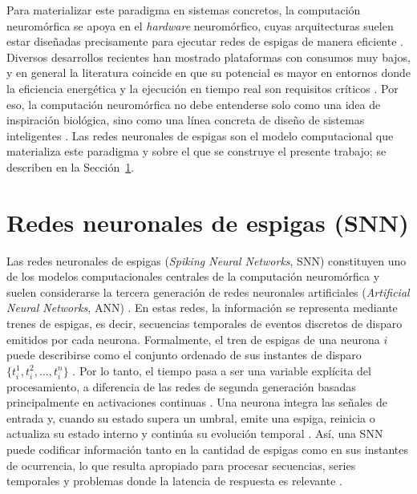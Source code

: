 Para materializar este paradigma en sistemas concretos, la computación neuromórfica se apoya en el \textit{hardware} neuromórfico, cuyas arquitecturas suelen estar diseñadas precisamente para ejecutar redes de espigas de manera eficiente \cite{Schuman2022Opportunities, Muir2025commercialsuccessforneuromorphictechnologies, Yao2024neuromorphicchip}. Diversos desarrollos recientes han mostrado plataformas con consumos muy bajos, y en general la literatura coincide en que su potencial es mayor en entornos donde la eficiencia energética y la ejecución en tiempo real son requisitos críticos \cite{yan2026reconsideringenergyefficiencyspiking}. Por eso, la computación neuromórfica no debe entenderse solo como una idea de inspiración biológica, sino como una línea concreta de diseño de sistemas inteligentes \cite{Kudithipudi2025Neuromorphiccomputingatscale}. Las redes neuronales de espigas son el modelo computacional que materializa este paradigma y sobre el que se construye el presente trabajo; se describen en la Sección~\ref{sec:snn}.


\section{Redes neuronales de espigas (SNN)}\label{sec:snn}

Las redes neuronales de espigas (\textit{Spiking Neural Networks}, SNN) constituyen uno de los modelos computacionales centrales de la computación neuromórfica y suelen considerarse la tercera generación de redes neuronales artificiales (\textit{Artificial Neural Networks}, ANN) \cite{MAASS19971659ssnthirdgeneration}. En estas redes, la información se representa mediante trenes de espigas, es decir, secuencias temporales de eventos discretos de disparo emitidos por cada neurona. Formalmente, el tren de espigas de una neurona $i$ puede describirse como el conjunto ordenado de sus instantes de disparo $\{t_i^1, t_i^2, \dots, t_i^n\}$ \cite{Gerstner2002spikingneuronmodels}. Por lo tanto, el tiempo pasa a ser una variable explícita del procesamiento, a diferencia de las redes de segunda generación basadas principalmente en activaciones continuas \cite{Henkes2024snnnonlinearregression}. Una neurona integra las señales de entrada y, cuando su estado supera un umbral, emite una espiga, reinicia o actualiza su estado interno y continúa su evolución temporal \cite{Izhikevich2003}. Así, una SNN puede codificar información tanto en la cantidad de espigas como en sus instantes de ocurrencia, lo que resulta apropiado para procesar secuencias, series temporales y problemas donde la latencia de respuesta es relevante \cite{Zanatta2024snnrlrobotic, Voudaskas2025snninimaging, Ding2025neuroparadigms}.

